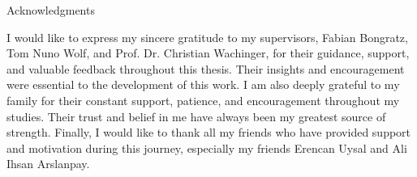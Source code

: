 \thispagestyle{empty}

\vspace*{20mm}

\begin{center}
    { Acknowledgments}
\end{center}

\vspace{10mm}

I would like to express my sincere gratitude to my supervisors, Fabian Bongratz, Tom Nuno Wolf, and Prof. Dr. Christian Wachinger, for their guidance, support, and valuable feedback throughout this thesis. Their insights and encouragement were essential to the development of this work.
I am also deeply grateful to my family for their constant support, patience, and encouragement throughout my studies. Their trust and belief in me have always been my greatest source of strength.
Finally, I would like to thank all my friends who have provided support and motivation during this journey, especially my friends Erencan Uysal and Ali Ihsan Arslanpay.
\cleardoublepage{}
